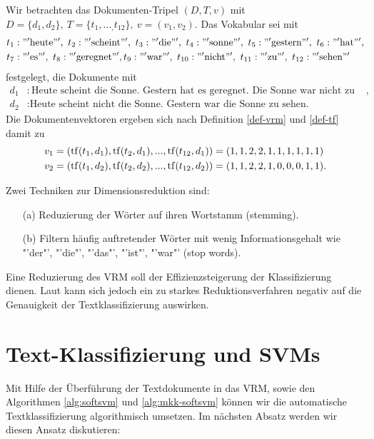 \begin{beispiel}
	Wir betrachten das Dokumenten-Tripel $(D,T,v)$ mit $D=\{d_1,d_2\},\ T = \{t_1,..._,t_{12}\},\ v=(v_1,v_2)$.
	Das Vokabular sei mit
	$$ \begin{aligned}
	& t_1:"'\text{heute}"',\ t_2:"'\text{scheint}"',\ t_3:"'\text{die}"',\ t_4:"'\text{sonne}"',\ t_5: "'\text{gestern}"',\ t_6:"'\text{hat}"', \\
	& t_7:"'\text{es}"',\ t_8:"'\text{geregnet}"', t_9:"'\text{war}"',\ t_{10}:"'\text{nicht}"',\ t_{11}:"'\text{zu}"',\ t_{12}:"'\text{sehen}"'
	\end{aligned}$$
	festgelegt, die Dokumente mit
	$$
	\begin{aligned}
	d_1&:\text{Heute scheint die Sonne. Gestern hat es geregnet. Die Sonne war nicht zu sehen}, \\
	d_2&:\text{Heute scheint nicht die Sonne. Gestern war die Sonne zu sehen.}
	\end{aligned}
	$$
	Die Dokumentenvektoren ergeben sich nach Definition \ref{def-vrm} und \ref{def-tf} damit zu 
	$$
	\begin{aligned}
	v_1 &=(\operatorname{tf}(t_1,d_1),\operatorname{tf}(t_2,d_1), ...,\operatorname{tf}(t_{12},d_1)) = (1,1,2,2,1,1,1,1,1,1)   \\
	v_2 &=(\operatorname{tf}(t_1,d_2),\operatorname{tf}(t_2,d_2), ...,\operatorname{tf}(t_{12},d_2)) = (1,1,2,2,1,0,0,0,1,1).
	\end{aligned}
	$$
\end{beispiel}

\begin{bemerkung}[Dimensionsreduktion]
	Zwei Techniken zur Dimensionsreduktion sind:
	\begin{itemize}
		\item[(a)] Reduzierung der Wörter auf ihren Wortstamm (stemming).
		
		\item[(b)] Filtern häufig auftretender Wörter mit wenig Informationsgehalt wie "'der"', "'die"', "'das"', "'ist"', "'war"' (stop words).
	\end{itemize}
\end{bemerkung}

Eine Reduzierung des VRM soll der Effizienzsteigerung der Klassifizierung dienen. Laut \cite{j-tcsvmmf} kann sich jedoch ein zu starkes Reduktionsverfahren negativ auf die Genauigkeit der Textklassifizierung auswirken. 

\section{Text-Klassifizierung und SVMs}\label{sec:anwendung-txt-klas-svm}
Mit Hilfe der Überführung der Textdokumente in das VRM, sowie den Algorithmen \ref{alg:softsvm} und \ref{alg:mkk-softsvm} können wir die automatische Textklassifizierung algorithmisch umsetzen. Im nächsten Absatz werden wir diesen Ansatz diskutieren: 

